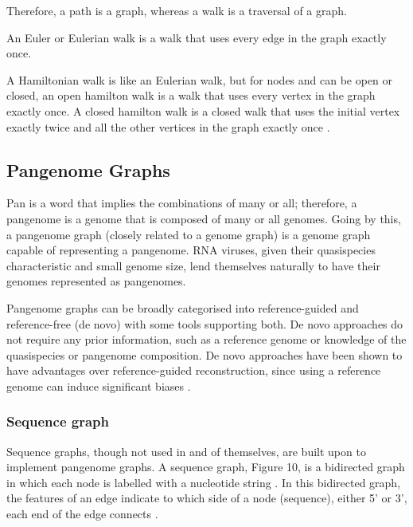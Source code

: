 \documentclass[10pt, a4paper]{article}
\begin{document}
Therefore, a path is a graph, whereas a walk is a traversal of a graph.

An Euler or Eulerian walk is a walk that uses every edge in the graph exactly
once.

A Hamiltonian walk is like an Eulerian walk, but for nodes and can be open or
closed, an open hamilton walk is a walk that uses every vertex in the graph
exactly once.
A closed hamilton walk is a closed walk that uses the initial vertex exactly
twice and all the other vertices in the graph exactly once
\cite{trudeauIntroductionGraphTheory1993}.

\newpage

\subsection{Pangenome Graphs}
\label{sec:org97f8167}
Pan is a word that implies the combinations of many or all; therefore, a
pangenome is a genome that is composed of many or all genomes. Going by this, a
pangenome graph (closely related to a genome graph) is a genome graph capable of
representing a pangenome.
RNA viruses, given their quasispecies characteristic and small genome size,
lend themselves naturally to have their genomes represented as pangenomes.

Pangenome graphs can be broadly categorised into reference-guided and
reference-free (de novo) with some tools supporting both. De novo approaches do
not require any prior information, such as a reference genome or knowledge of
the quasispecies or pangenome composition. De novo approaches have been shown to
have advantages over reference-guided reconstruction, since using a reference
genome can induce significant biases \cite{baaijensStrainawareAssemblyGenomes2019}.

\subsubsection{Sequence graph}
\label{sec:org58f370a}
Sequence graphs, though not used in and of themselves, are built upon to
implement pangenome graphs.
A sequence graph, Figure 10, is a bidirected graph in which each node is
labelled with a nucleotide string \cite{patenGenomeGraphsEvolution2017}.
In this bidirected graph, the features of an edge indicate to which side of a
node (sequence), either 5’ or 3’, each end of the edge connects
\cite{novakGenomeGraphs2017}.
\end{document}
